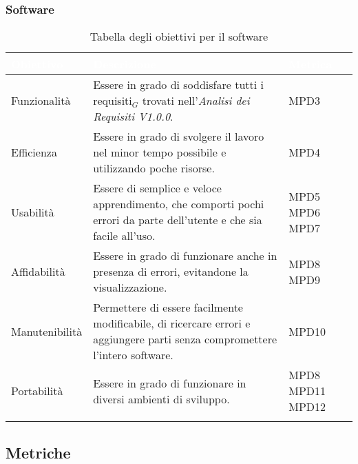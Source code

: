 \subsubsection{Software}
\begin{center}
  \renewcommand{\arraystretch}{1.25}
  \begin{longtable}{|p{3cm}|p{7.5cm}|p{2cm}|} \hline
    \rowcolor[HTML]{036400}
    \textcolor{white}{\textbf{Obiettivo}} & \textcolor{white}{\textbf{Descrizione}} & \textcolor{white}{\textbf{Metrica}}  \\ \hline
    \rowcolor[HTML]{EFEFEF}
    Funzionalità & Essere in grado di soddisfare tutti i requisiti$_G$ trovati nell'\textit{Analisi dei Requisiti V1.0.0}.  & MPD3       \\ \hline
    \rowcolor[HTML]{C0C0C0}
    Efficienza & Essere in grado di svolgere il lavoro nel minor tempo possibile e utilizzando poche risorse.   & MPD4       \\ \hline
    \rowcolor[HTML]{EFEFEF}
    Usabilità & Essere di semplice e veloce apprendimento, che comporti pochi errori da parte dell'utente e che sia facile all'uso.  & MPD5 \newline MPD6 \newline MPD7    \\ \hline
    \rowcolor[HTML]{C0C0C0}
    Affidabilità & Essere in grado di funzionare anche in presenza di errori, evitandone la visualizzazione.  & MPD8 \newline MPD9       \\ \hline
    \rowcolor[HTML]{EFEFEF}
    Manutenibilità & Permettere di essere facilmente modificabile, di ricercare errori e aggiungere parti senza compromettere l'intero software.  & MPD10       \\ \hline
    \rowcolor[HTML]{C0C0C0}
    Portabilità & Essere in grado di funzionare in diversi ambienti di sviluppo. & MPD8 \newline MPD11 \newline MPD12       \\ \hline
    \caption{Tabella degli obiettivi per il software}
  \end{longtable}
\end{center}


\subsection{Metriche}

